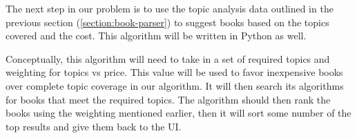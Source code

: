 
The next step in our problem is to use the topic analysis data outlined in the previous section (\ref{section:book-parser}) to suggest books based on the topics covered and the cost.
This algorithm will be written in Python as well.  

Conceptually, this algorithm will need to take in a set of required topics and weighting for topics vs price.
This value will be used to favor inexpensive books over complete topic coverage in our algorithm.
It will then search its algorithms for books that meet the required topics.
The algorithm should then rank the books using the weighting mentioned earlier, then it will sort some number of the top results and give them back to the UI.